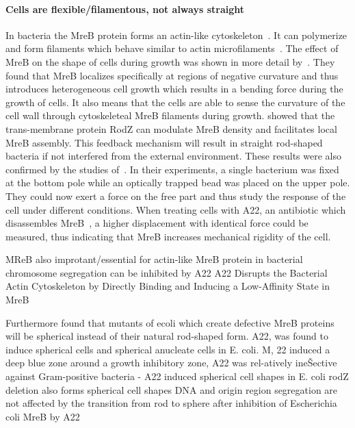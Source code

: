 \documentclass{article}
\begin{document}
\paragraph{Cells are flexible/filamentous, not always straight}

In bacteria the MreB protein forms an actin-like cytoskeleton~\cite{Erickson2001}.
It can polymerize and form filaments which behave similar to actin microfilaments~\cite{Dersch2020}.
The effect of MreB on the shape of cells during growth was shown in more detail
by~\cite{Ursell2014}.
They found that MreB localizes specifically at regions of negative curvature and thus introduces
heterogeneous cell growth which results in a bending force during the growth of cells.
It also means that the cells are able to sense the curvature of the cell wall through cytoskeleteal
MreB filaments during growth.
\cite{Bratton2018} showed that the trans-membrane protein RodZ can modulate MreB density and
facilitates local MreB assembly.
This feedback mechanism will result in straight rod-shaped bacteria if not interfered from the
external environment.
These results were also confirmed by the studies of~\cite{Wang2010}.
In their experiments, a single bacterium was fixed at the bottom pole while an optically trapped
bead was placed on the upper pole.
They could now exert a force on the free part and thus study the response of the cell under
different conditions.
When treating cells with A22, an antibiotic which disassembles
MreB~\cite{IWAI2002,Gitai2005,Karczmarek2007,Bean2009}, a higher displacement with identical force
could be measured, thus indicating that MreB increases mechanical rigidity of the cell.

MReB also improtant/essential for actin-like MreB protein in bacterial chromosome segregation can be inhibited by A22 \cite{Gitai2005}A22 Disrupts the Bacterial Actin Cytoskeleton by Directly Binding and Inducing a Low-Affinity State in MreB \cite{Bean2009}


Furthermore \cite{Wachi1987} found that mutants of \ac{ecoli} which create defective MreB proteins will be spherical instead of their natural rod-shaped form.
A22, was found to induce spherical cells and spherical anucleate cells in E. coli. M, 22 induced a deep blue zone around a growth inhibitory zone, A22 was rel-atively ineŠective against Gram-positive bacteria - A22 induced spherical cell shapes in E. coli \cite{IWAI2002} 
rodZ deletion also forms spherical cell shapes \cite{Shiomi2008}
DNA and origin region segregation are not affected by the transition from rod to sphere after inhibition of Escherichia coli MreB by A22 \cite{Karczmarek2007}
\end{document}
